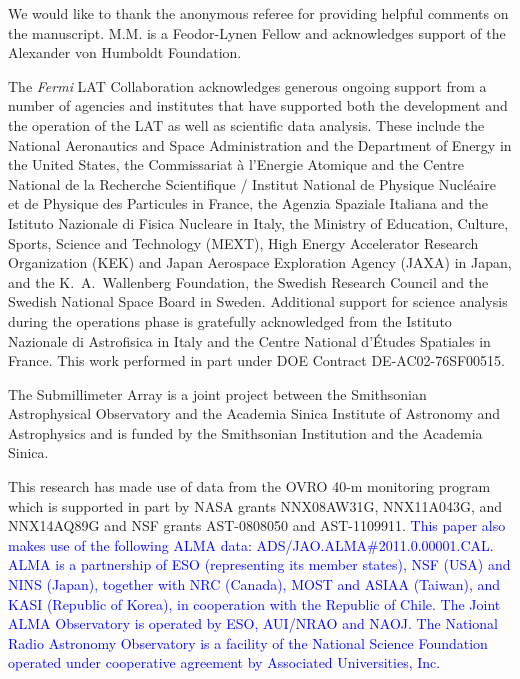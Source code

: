 \documentclass[twocolumn,linenumbers]{aastex62}
\newcommand{\response}[1]{\textcolor{blue}{#1}}
\begin{document}
\begin{acknowledgments}
We would like to thank the anonymous referee for providing helpful comments on the manuscript.
M.M.  is  a  Feodor-Lynen Fellow and acknowledges support of the Alexander von Humboldt  Foundation.

The \textit{Fermi} LAT Collaboration acknowledges generous ongoing support
from a number of agencies and institutes that have supported both the
development and the operation of the LAT as well as scientific data analysis.
These include the National Aeronautics and Space Administration and the
Department of Energy in the United States, the Commissariat \`a l'Energie Atomique
and the Centre National de la Recherche Scientifique / Institut National de Physique
Nucl\'eaire et de Physique des Particules in France, the Agenzia Spaziale Italiana
and the Istituto Nazionale di Fisica Nucleare in Italy, the Ministry of Education,
Culture, Sports, Science and Technology (MEXT), High Energy Accelerator Research
Organization (KEK) and Japan Aerospace Exploration Agency (JAXA) in Japan, and
the K.~A.~Wallenberg Foundation, the Swedish Research Council and the
Swedish National Space Board in Sweden.
Additional support for science analysis during the operations phase is gratefully
acknowledged from the Istituto Nazionale di Astrofisica in Italy and the Centre
National d'\'Etudes Spatiales in France. This work performed in part under DOE
Contract DE-AC02-76SF00515.

The Submillimeter Array is a joint project between the Smithsonian Astrophysical Observatory and the Academia Sinica Institute of Astronomy and Astrophysics and is funded by the Smithsonian Institution and the Academia Sinica.

This research has made use of data from the OVRO 40-m monitoring program~\citep{2011ApJS..194...29R} which is supported in part by NASA grants NNX08AW31G, NNX11A043G, and NNX14AQ89G and NSF grants AST-0808050 and AST-1109911.
\response{
This paper also makes use of the following ALMA data: ADS/JAO.ALMA\#2011.0.00001.CAL. ALMA is a partnership of ESO (representing its member states), NSF (USA) and NINS (Japan), together with NRC (Canada), MOST and ASIAA (Taiwan), and KASI (Republic of Korea), in cooperation with the Republic of Chile. The Joint ALMA Observatory is operated by ESO, AUI/NRAO and NAOJ. The National Radio Astronomy Observatory is a facility of the National Science Foundation operated under cooperative agreement by Associated Universities, Inc.
}
\end{acknowledgments}
\end{document}
